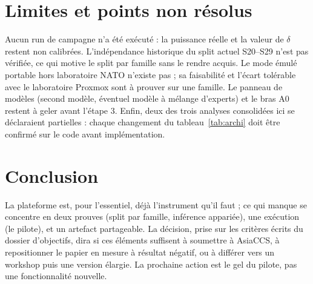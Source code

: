 \documentclass[11pt,a4paper]{article}
\begin{document}
\section{Limites et points non r\'esolus}
\label{sec:limites}

Aucun run de campagne n'a \'et\'e ex\'ecut\'e : la puissance r\'eelle et la valeur de $\delta$ restent non calibr\'ees. L'ind\'ependance historique du split actuel S20--S29 n'est pas v\'erifi\'ee, ce qui motive le split par famille sans le rendre acquis. Le mode \'emul\'e portable hors laboratoire NATO n'existe pas ; sa faisabilit\'e et l'\'ecart tol\'erable avec le laboratoire Proxmox sont \`a prouver sur une famille. Le panneau de mod\`eles (second mod\`ele, \'eventuel mod\`ele \`a m\'elange d'experts) et le bras A0 restent \`a geler avant l'\'etape 3. Enfin, deux des trois analyses consolid\'ees ici se d\'eclaraient partielles : chaque changement du tableau~\ref{tab:archi} doit \^etre confirm\'e sur le code avant impl\'ementation.

\section{Conclusion}

La plateforme est, pour l'essentiel, d\'ej\`a l'instrument qu'il faut ; ce qui manque se concentre en deux prouves (split par famille, inf\'erence appari\'ee), une ex\'ecution (le pilote), et un artefact partageable. La d\'ecision, prise sur les crit\`eres \'ecrits du dossier d'objectifs, dira si ces \'el\'ements suffisent \`a soumettre \`a AsiaCCS, \`a repositionner le papier en mesure \`a r\'esultat n\'egatif, ou \`a diff\'erer vers un workshop puis une version \'elargie. La prochaine action est le gel du pilote, pas une fonctionnalit\'e nouvelle.
\end{document}
